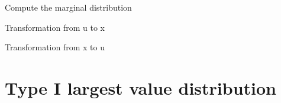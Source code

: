 \documentclass[letterpaper,10pt,english]{sphinxmanual}
\begin{document}
\begin{fulllineitems}
\begin{fulllineitems}
Compute the marginal distribution

\end{fulllineitems}



\begin{fulllineitems}
Transformation from u to x

\end{fulllineitems}



\begin{fulllineitems}
Transformation from x to u

\end{fulllineitems}


\end{fulllineitems}



\section{Type I largest value distribution}
\label{distributions:type-i-largest-value-distribution}
\end{document}
